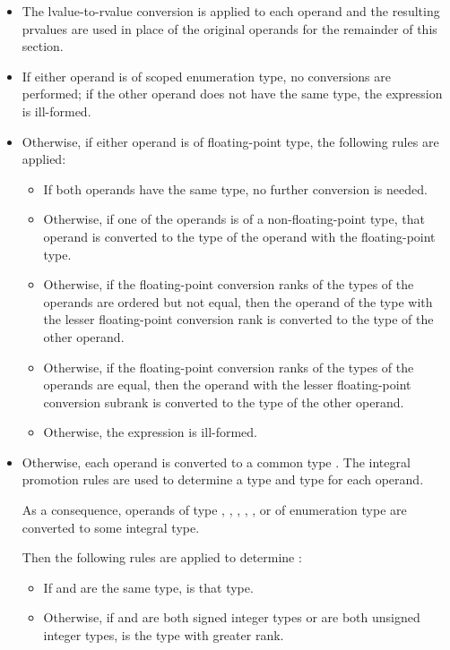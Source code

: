 \begin{itemize}
\item The lvalue-to-rvalue conversion
is applied to each operand and
the resulting prvalues are used in place of the original operands
for the remainder of this section.
\item If either operand is of scoped enumeration type, no conversions
are performed; if the other operand does not have the same type, the expression is
ill-formed.
\item Otherwise, if either operand is of floating-point type,
the following rules are applied:
\begin{itemize}
\item
If both operands have the same type, no further conversion is needed.
\item
Otherwise, if one of the operands is of a non-floating-point type,
that operand is converted to the type of
the operand with the floating-point type.
\item
Otherwise, if the floating-point conversion ranks of
the types of the operands are ordered but not equal,
then the operand of the type with the lesser floating-point conversion rank
is converted to the type of the other operand.
\item
Otherwise, if the floating-point conversion ranks of the types of
the operands are equal,
then the operand with the lesser floating-point conversion subrank
is converted to the type of the other operand.
\item
Otherwise, the expression is ill-formed.
\end{itemize}
\item Otherwise, each operand is converted to a common type .
The integral promotion rules are used
to determine a type  and type  for each operand.
\begin{footnote}
As a consequence, operands of type , , ,
, , or of enumeration type are converted
to some integral type.
\end{footnote}
Then the following rules are applied to determine :

\begin{itemize}

\item If  and  are the same type,  is that type.

\item Otherwise, if  and  are both signed integer types or
are both unsigned integer types,
 is the type with greater rank.


\end{itemize}
\end{itemize}
